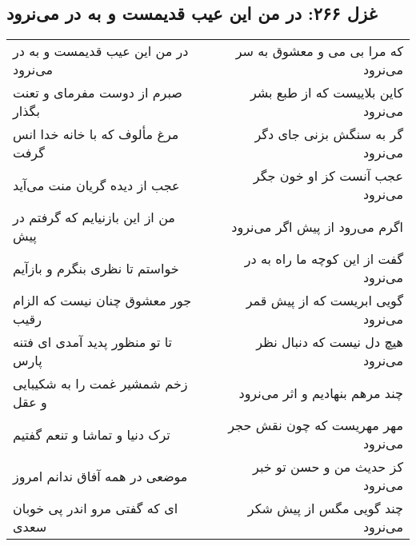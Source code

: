 \begin{center}
\section*{غزل ۲۶۶: در من این عیب قدیمست و به در می‌نرود}
\label{sec:266}
\begin{longtable}{l p{0.5cm} r}
در من این عیب قدیمست و به در می‌نرود
&&
که مرا بی می و معشوق به سر می‌نرود
\\
صبرم از دوست مفرمای و تعنت بگذار
&&
کاین بلاییست که از طبع بشر می‌نرود
\\
مرغ مألوف که با خانه خدا انس گرفت
&&
گر به سنگش بزنی جای دگر می‌نرود
\\
عجب از دیده گریان منت می‌آید
&&
عجب آنست کز او خون جگر می‌نرود
\\
من از این بازنیایم که گرفتم در پیش
&&
اگرم می‌رود از پیش اگر می‌نرود
\\
خواستم تا نظری بنگرم و بازآیم
&&
گفت از این کوچه ما راه به در می‌نرود
\\
جور معشوق چنان نیست که الزام رقیب
&&
گویی ابریست که از پیش قمر می‌نرود
\\
تا تو منظور پدید آمدی ای فتنه پارس
&&
هیچ دل نیست که دنبال نظر می‌نرود
\\
زخم شمشیر غمت را به شکیبایی و عقل
&&
چند مرهم بنهادیم و اثر می‌نرود
\\
ترک دنیا و تماشا و تنعم گفتیم
&&
مهر مهریست که چون نقش حجر می‌نرود
\\
موضعی در همه آفاق ندانم امروز
&&
کز حدیث من و حسن تو خبر می‌نرود
\\
ای که گفتی مرو اندر پی خوبان سعدی
&&
چند گویی مگس از پیش شکر می‌نرود
\\
\end{longtable}
\end{center}
